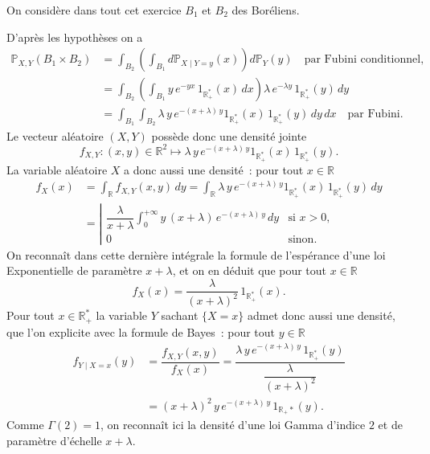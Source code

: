 On considère dans tout cet exercice \(B_1\) et \(B_2\) des Boréliens.

\label{III-answer-loiconj-expexp}
D'après les hypothèses on a \begin{align*}
\mathbb{P}_{X,Y}(B_1\times B_2) &= \int_{B_2} \left(\int_{B_1} d\mathbb{P}_{X\mid Y = y}(x) \right) d\mathbb{P}_Y(y) \hspace{1em}\text{par Fubini conditionnel,}\\
&= \int_{B_2} \left(\int_{B_1} y\,e^{-y x}\,1_{\mathbb{R}_+^\ast}(x)\,dx \right) \lambda\,e^{-\lambda y}\,1_{\mathbb{R}_+^\ast}(y)\,dy\\
&= \int_{B_1} \int_{B_2} \lambda\, y\,e^{-(x+\lambda)\,y}1_{\mathbb{R}_+^\ast}(x)\,1_{\mathbb{R}_+^\ast}(y) \,dy\, dx \hspace{1em}\text{par Fubini.}
\end{align*} Le vecteur aléatoire \((X,Y)\) possède donc une densité
jointe
\[f_{X,Y} : (x,y) \in\mathbb{R}^2 \mapsto \lambda\, y\,e^{-(x+\lambda)\,y}1_{\mathbb{R}_+^\ast}(x)\,1_{\mathbb{R}_+^\ast}(y).\]
La variable aléatoire \(X\) a donc aussi une densité~: pour tout
\(x\in\mathbb{R}\) \begin{align*}
f_X(x) &= \int_{\mathbb{R}} f_{X,Y}(x,y)\,dy = \int_\mathbb{R}\lambda\, y\,e^{-(x+\lambda)\,y}1_{\mathbb{R}_+^\ast}(x)\,1_{\mathbb{R}_+^\ast}(y)\,dy\\
&= \left|\begin{array}{ll}\displaystyle \dfrac{\lambda}{x+\lambda} \int_{0}^{+\infty} y\,(x+\lambda)\,e^{-(x+\lambda)\,y}\,dy & \text{si } x>0,\\[1em] 0 & \text{sinon.} \end{array}\right.
\end{align*} On reconnaît dans cette dernière intégrale la formule de
l'espérance d'une loi Exponentielle de paramètre \(x+\lambda\), et on en
déduit que pour tout \(x\in\mathbb{R}\)
\[f_X(x) = \dfrac{\lambda}{(x+\lambda)^2}\,1_{\mathbb{R}_+^\ast}(x).\]
Pour tout \(x\in\mathbb{R}_+^\ast\) la variable \(Y\) sachant
\(\{X=x\}\) admet donc aussi une densité, que l'on explicite avec la
formule de Bayes~: pour tout \(y\in\mathbb{R}\) \begin{align*}
f_{Y\mid X=x}(y) &= \dfrac{f_{X,Y}(x,y)}{f_X(x)} = \dfrac{\lambda\, y\,e^{-(x+\lambda)\,y}\,1_{\mathbb{R}_+^\ast}(y)}{\dfrac{\lambda}{(x+\lambda)^2}}\\
&= (x+\lambda)^2\,y\,e^{-(x+\lambda)\,y}\,1_{\mathbb{R}_+\ast}(y).
\end{align*} Comme \(\Gamma(2) = 1\), on reconnaît ici la densité d'une
loi Gamma d'indice \(2\) et de paramètre d'échelle \(x+\lambda\).

